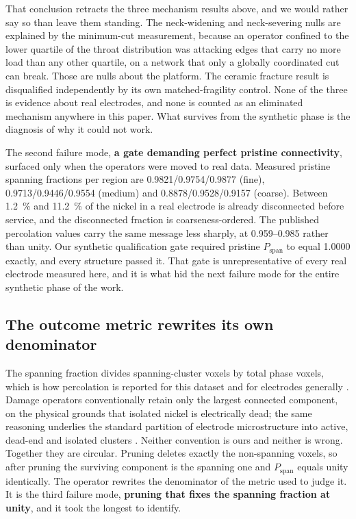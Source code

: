 \documentclass[5p,times,twocolumn]{elsarticle}
\newcommand{\Pspan}{P_{\mathrm{span}}}
\begin{document}
That conclusion retracts the three mechanism results above, and we would
rather say so than leave them standing. The neck-widening and neck-severing
nulls are explained by the minimum-cut measurement, because an operator
confined to
the lower quartile of the throat distribution was attacking edges that carry
no more load than any other quartile, on a network that only a globally
coordinated cut can break. Those are nulls about the platform. The ceramic
fracture result is disqualified independently by its own matched-fragility
control. None of the three is evidence about real electrodes, and none is
counted as an eliminated mechanism anywhere in this paper. What survives from
the synthetic phase is the diagnosis of why it could not work.

The second failure mode, \textbf{a gate demanding perfect pristine
connectivity}, surfaced only when the operators were moved to real
data. Measured pristine spanning fractions per region are
0.9821/0.9754/0.9877 (fine), 0.9713/0.9446/0.9554 (medium) and
0.8878/0.9528/0.9157 (coarse). Between \SI{1.2}{\percent} and
\SI{11.2}{\percent} of the nickel in a real electrode is already disconnected
before service, and the disconnected fraction is coarseness-ordered. The
published percolation values carry the same message less sharply, at
\numrange{0.959}{0.985} rather than unity. Our synthetic qualification gate
required pristine $\Pspan$ to equal 1.0000 exactly, and every structure passed
it. That gate is unrepresentative of every real electrode measured here, and
it is what hid the next failure mode for the entire synthetic phase of the
work.

\subsection{The outcome metric rewrites its own denominator}
\label{sec:pruning}

The spanning fraction divides spanning-cluster voxels by total phase voxels,
which is how percolation is reported for this dataset and for electrodes
generally \cite{pecho2015transport}. Damage operators conventionally retain
only the largest connected component, on the physical grounds that isolated
nickel is electrically dead; the same reasoning underlies the standard
partition of electrode microstructure into active, dead-end and isolated
clusters \cite{chen2011}. Neither convention is ours and neither is wrong.
Together they are circular. Pruning deletes exactly the non-spanning voxels,
so after pruning the surviving component is the spanning one and
$\Pspan$ equals unity identically. The operator rewrites the denominator of
the metric used to judge it. It is the third failure mode, \textbf{pruning that fixes the spanning fraction
at unity}, and it took the longest to identify.
\end{document}
